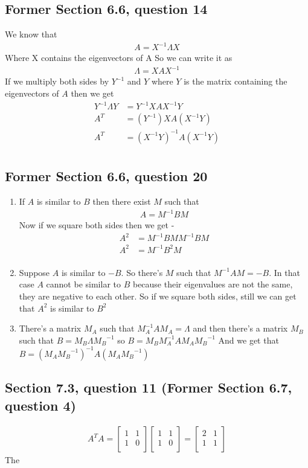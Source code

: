 \documentclass[a4paper,11pt]{article}
\newcommand{\?}{\stackrel{?}{=}}
\begin{document}
\subsection*{Former Section 6.6, question 14}
We know that 
\begin{align*}
A=X^{-1}\Lambda{X}
\end{align*}
Where X contains the eigenvectors of A
So we can write it as 
\begin{align*}
\Lambda = X{A}X^{-1}
\end{align*}
If we multiply both sides by $Y^{-1}$ and $Y$ where $Y$ is the matrix containing the eigenvectors of $A$ then we get
\begin{align*}
Y^{-1}\Lambda{Y} &= Y^{-1}X{A}X^{-1}{Y} \\
A^T &= (Y^{-1})X{A}(X^{-1}{Y})\\
A^T &= (X^{-1}{Y})^{-1}{A}(X^{-1}{Y})\\
\end{align*}
\subsection*{Former Section 6.6, question 20}
\begin{enumerate}[label=\alph*]
\item 
If $A$ is similar to $B$ then there exist $M$ such that
\begin{align*}
A=M^{-1}B{M}
\end{align*}
Now if we square both sides then we get - 
\begin{align*}
A^2&=M^{-1}B{M}M^{-1}B{M} \\
A^2&=M^{-1}B^2{M} \\
\end{align*}
\item
Suppose $A$ is similar to $-B$. So there's $M$ such that $M^{-1}A{M}=-B$. In that case $A$ cannot be similar to $B$ because their eigenvalues are not the same, they are negative to each other. So if we square both sides, still we can get that $A^2$ is similar to $B^2$
\item
There's a matrix $M_A$ such that $M_A^{-1}{A}M_A=\Lambda$ and then there's a matrix $M_B$ such that  ${B}=M_B\Lambda{M_B}^{-1}$ so ${B}=M_BM_A^{-1}{A}M_A{M_B}^{-1}$ And we get that $B=(M_A{M_B}^{-1})^{-1}{A}(M_A{M_B}^{-1})$
\end{enumerate}
\subsection*{Section 7.3, question 11 (Former Section 6.7, question 4)}
\begin{align*}
A^T{A}=
\begin{bmatrix}
1 & 1 \\
1 & 0 \\
\end{bmatrix}
\begin{bmatrix}
1 & 1 \\
1 & 0 \\
\end{bmatrix}
=
\begin{bmatrix}
2 & 1 \\
1 & 1 \\
\end{bmatrix}
\end{align*}
The 
\end{document}
